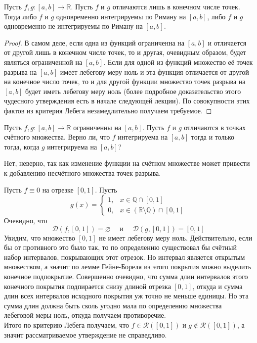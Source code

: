 \documentclass[11pt]{article}
\begin{document}
\begin{lemma}
    Пусть $f, g \colon [a, b] \to \mathbb{R}$. Пусть $f$ и $g$ отличаются лишь в конечном числе точек. Тогда либо $f$ и $g$ одновременно интегрируемы по Риману на $[a, b]$, либо $f$ и $g$ одновременно не интегрируемы по Риману на $[a, b]$.
\end{lemma}

\begin{proof}
    В самом деле, если одна из функций ограниченна на $[a, b]$ и отличается от другой лишь в конечном числе точек, то и другая, очевидным образом, будет являться ограниченной на $[a, b]$. Если для одной из функций множество её точек разрыва на $[a, b]$ имеет лебегову меру ноль и эта функция отличается от другой на конечное число точек, то и для другой функции множество точек разрыва на $[a, b]$ будет иметь лебегову меру ноль (более подробное доказательство этого чудесного утверждения есть в начале следующей лекции). По совокупности этих фактов из критерия Лебега незамедлительно получаем требуемое.
\end{proof}

\begin{question}
    Пусть $f, g \colon [a, b] \to \mathbb{R}$ ограниченны на $[a, b]$. Пусть $f$ и $g$ отличаются в точках счётного множества. Верно ли, что $f$ интегрируема на $[a, b]$ тогда и только тогда, когда $g$ интегрируема на $[a, b]$?
\end{question}

\begin{answer}
    Нет, неверно, так как изменение функции на счётном множестве может привести к добавлению несчётного множества точек разрыва.
\end{answer}

\begin{example}
    Пусть $f \equiv 0$ на отрезке $[0, 1]$. Пусть
    \begin{equation*}
        g(x) = 
        \begin{cases}
            1, & x \in \mathbb{Q} \cap [0, 1] \\
            0, & x \in (\mathbb{R} \setminus \mathbb{Q}) \cap [0, 1]
        \end{cases}
    \end{equation*}
    Очевидно, что 
    \[\mathcal{D}(f, [0, 1]) = \varnothing \quad \text{ и } \quad \mathcal{D}(g, [0, 1]) = [0, 1]\]
    Увидим, что множество $[0, 1]$ не имеет лебегову меру ноль. Действительно, если бы от противного это было так, то по определению существовал бы счётный набор интервалов, покрывающих этот отрезок. Но интервал является открытым множеством, а значит по лемме Гейне-Бореля из этого покрытия можно выделить конечное подпокрытие. Совершенно очевидно, что сумма длин интервалов этого конечного покрытия подпирается снизу длиной отрезка $[0, 1]$, откуда и сумма длин всех интервалов исходного покрытия уж точно не меньше единицы. Но эта сумма длин должна быть сколь угодно мала по определению множества лебеговой меры ноль, откуда получаем противоречие. \\
    Итого по критерию Лебега получаем, что $f \in \mathcal{R}([0, 1])$ и $g \not \in \mathcal{R}([0, 1])$, а значит рассматриваемое утверждение не справедливо.
\end{example}
\end{document}
